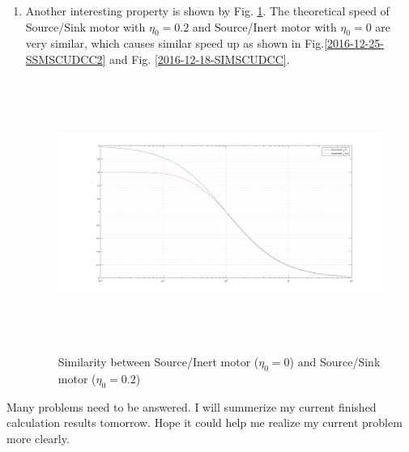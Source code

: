 \documentclass[fontsize=11pt, %
                             paper=a4, %
                             twoside, %
                             captions=tableheading,
                             index=totoc,
                             hyperref]{labbook}
\begin{document}
\begin{addmargin}[4cm]{0cm}
\begin{enumerate}
\item Another interesting property is shown by Fig. \ref{2016-12-25-SBSISS}. The theoretical speed of Source/Sink motor with $\eta_0=0.2$ and Source/Inert motor with $\eta_0=0$ are very similar, which causes similar speed up as shown in Fig.\ref{2016-12-25-SSMSCUDCC2} and Fig. \ref{2016-12-18-SIMSCUDCC}.
\begin{figure}
\centering
\includegraphics[width=\linewidth, height=3.5in]{2016-12-25-similar.png}
\caption{Similarity between Source/Inert motor ($\eta_0=0$) and Source/Sink motor ($\eta_0=0.2$)}\label{2016-12-25-SBSISS}
\end{figure}
\end{enumerate}
Many problems need to be answered. I will summerize my current finished calculation results tomorrow. Hope it could help me realize my current problem more clearly.

\end{addmargin}
\end{document}
